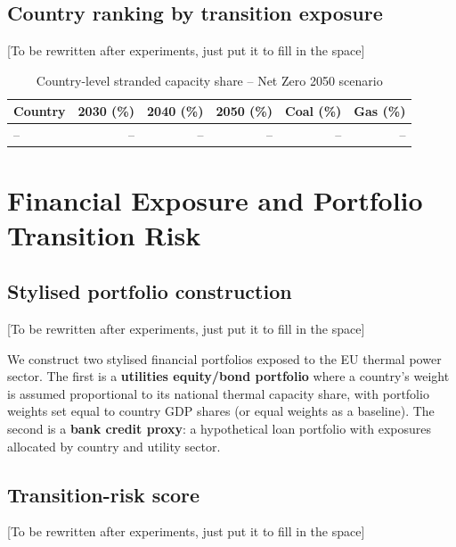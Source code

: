 \documentclass[a4paper, 12pt]{report}
\numberwithin{equation}{chapter}
\numberwithin{figure}{chapter}
\numberwithin{table}{chapter}
\begin{document}
\section{Country ranking by transition exposure}

[To be rewritten after experiments, just put it to fill in the space]

\begin{table}[H]
\centering
\caption{Country-level stranded capacity share -- Net Zero 2050 scenario}
\label{tab:country_ranking}
\vspace{0.2cm}
\begin{tabular}{l r r r r r}
\toprule
\textbf{Country} & \textbf{2030 (\%)} & \textbf{2040 (\%)} & \textbf{2050 (\%)} & \textbf{Coal (\%)} & \textbf{Gas (\%)} \\
\midrule
-- & -- & -- & -- & -- & -- \\
\bottomrule
\end{tabular}
\end{table}


\chapter{Financial Exposure and Portfolio Transition Risk}
\label{ch:portfolio}

\section{Stylised portfolio construction}

[To be rewritten after experiments, just put it to fill in the space]

We construct two stylised financial portfolios exposed to the EU thermal power sector. The first is a \textbf{utilities equity/bond portfolio} where a country's weight is assumed proportional to its national thermal capacity share, with portfolio weights set equal to country GDP shares (or equal weights as a baseline). The second is a \textbf{bank credit proxy}: a hypothetical loan portfolio with exposures allocated by country and utility sector.

\section{Transition-risk score}

[To be rewritten after experiments, just put it to fill in the space]
\end{document}
